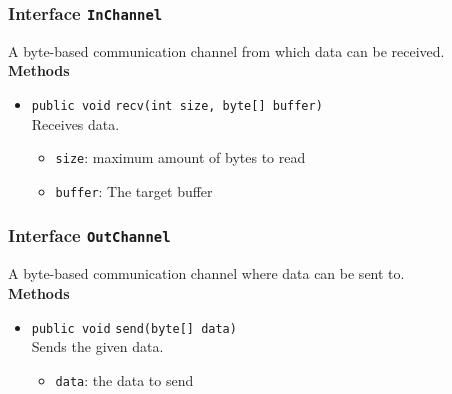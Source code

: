 \subsubsection{Interface \lstinline|InChannel|}
A byte-based communication channel from which data can be received. \\





\textbf{Methods}
\begin{itemize}
\item \lstinline|public void| \lstinline|recv|\lstinline|(int size, byte[] buffer)|\\
Receives data.
\begin{itemize}
\item \lstinline|size|: maximum amount of bytes to read
\item \lstinline|buffer|: The target buffer
\end{itemize}



\end{itemize}

\subsubsection{Interface \lstinline|OutChannel|}
A byte-based communication channel where data can be sent to. \\





\textbf{Methods}
\begin{itemize}
\item \lstinline|public void| \lstinline|send|\lstinline|(byte[] data)|\\
Sends the given data.
\begin{itemize}
\item \lstinline|data|: the data to send
\end{itemize}



\end{itemize}


